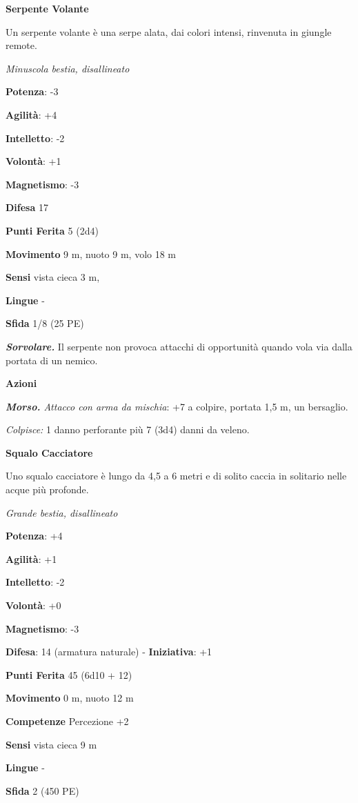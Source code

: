 \begin{multicols}{2}
\textbf{Serpente Volante}

Un serpente volante è una serpe alata, dai colori intensi, rinvenuta in
giungle remote.

\emph{Minuscola bestia, disallineato}

\textbf{Potenza}: -3

\textbf{Agilità}: +4

\textbf{Intelletto}: -2

\textbf{Volontà}: +1

\textbf{Magnetismo}: -3

\textbf{Difesa} 17

\textbf{Punti Ferita} 5 (2d4)

\textbf{Movimento} 9 m, nuoto 9 m, volo 18 m

\textbf{Sensi} vista cieca 3 m, 

\textbf{Lingue} -

\textbf{Sfida} 1/8 (25 PE)

\emph{\textbf{Sorvolare.}} Il serpente non provoca attacchi di
opportunità quando vola via dalla portata di un nemico.

\textbf{Azioni}

\emph{\textbf{Morso.} Attacco con arma da mischia}: +7 a colpire,
portata 1,5 m, un bersaglio.

\emph{Colpisce:} 1 danno perforante più 7 (3d4) danni da veleno.

\textbf{Squalo Cacciatore}

Uno squalo cacciatore è lungo da 4,5 a 6 metri e di solito caccia in
solitario nelle acque più profonde.

\emph{Grande bestia, disallineato}

\textbf{Potenza}: +4

\textbf{Agilità}: +1

\textbf{Intelletto}: -2

\textbf{Volontà}: +0

\textbf{Magnetismo}: -3

\textbf{Difesa}: 14 (armatura naturale) - \textbf{Iniziativa}: +1

\textbf{Punti Ferita} 45 (6d10 + 12)

\textbf{Movimento} 0 m, nuoto 12 m

\textbf{Competenze} Percezione +2

\textbf{Sensi} vista cieca 9 m

\textbf{Lingue} -

\textbf{Sfida} 2 (450 PE)


\end{multicols}
